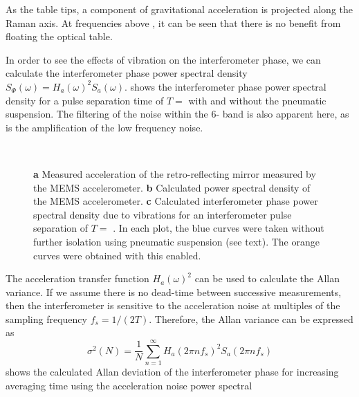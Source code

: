 As the table tips, a component of gravitational acceleration is
projected along the Raman axis. At frequencies above
, it can be seen that there is no benefit from
floating the optical table. 
\par\noindent
In order to see the effects of vibration on the interferometer phase,
we can calculate the interferometer phase power spectral density
$S_\Phi(\omega) = H_a(\omega)^2 S_a(\omega)$.
 shows the interferometer phase power
spectral density for a pulse
separation time of $T = $  with and
without the pneumatic suspension. The filtering of the noise within
the 6- band is also apparent here, as is the
amplification of the low frequency noise.  
\begin{figure}[htpb!]
  \centering
  \\
  \caption[Interferometer power spectral density due to vibration
  noise.]{\textbf{a} Measured acceleration of the retro-reflecting mirror
    measured by the MEMS accelerometer. \textbf{b} Calculated power
    spectral density of the MEMS accelerometer. \textbf{c} Calculated interferometer 
  phase power spectral density due to vibrations for an interferometer
pulse separation of $T = $ . In each plot, the blue
curves were taken without further isolation using pneumatic suspension
(see text). The orange curves were obtained with this enabled.} 
  \label{fig:vibration_spectrum}
\end{figure}
\par\noindent
The acceleration transfer function $H_a(\omega)^2$ can be used to
calculate the Allan variance. If we assume there is no dead-time
between successive measurements, then the interferometer is sensitive
to the acceleration noise at multiples of the sampling frequency $f_s
= 1/(2T)$. Therefore, the Allan variance can be expressed as 
\begin{equation}
  \sigma^2(N) = \frac{1}{N}
  \sum_{n=1}^{\infty} H_a(2\pi n f_s)^2 S_a(2\pi n f_s)
\end{equation} 
 shows the calculated Allan
deviation of the interferometer phase for
increasing averaging time using the acceleration noise power spectral
